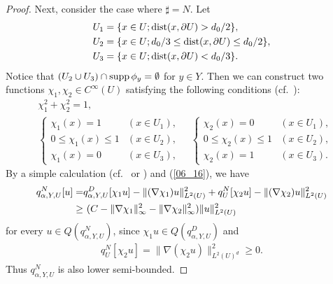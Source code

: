 \documentclass[12pt,a4paper]{article}
\def\supp{\mathop{\rm supp}\nolimits}
\def\dist{\mathop{\rm dist}\nolimits}
\begin{document}
\begin{proof}
Next, consider the case where $\sharp=N$.
Let
\begin{align*}
& U_1=\{x\in U;\dist(x,\partial U)>d_0/2\},\\
& U_2=\{x\in U;d_0/3\leq \dist(x,\partial U)\leq d_0/2\},\\
& U_3=\{x\in U;\dist(x,\partial U)<d_0/3\}.
\end{align*}
Notice that $(U_2\cup U_3)\cap \supp \phi_y=\emptyset$ for $y\in Y$.
Then we can construct two functions $\chi_1,\chi_2\in C^\infty(U)$
satisfying the following conditions
(cf.\ \cite[Proposition 8.1]{Do-Iw-Mi}):
\begin{align*}
& \chi_1^2+\chi_2^2=1,\\
&
\begin{cases}
\chi_1(x) =1 & (x\in U_1),\\
0\leq \chi_1(x) \leq 1 & (x\in U_2),\\
\chi_1(x) =0 & (x\in U_3),
\end{cases}
\quad 
\begin{cases}
\chi_2(x) =0 & (x\in U_1),\\
0\leq \chi_2(x) \leq 1 & (x\in U_2),\\
\chi_2(x) =1 & (x\in U_3).
\end{cases}
\end{align*}
By a simple calculation (cf.\ \cite[Theorem 3.2]{Cy-Fr-Ki-Si} or 
\cite[(6.14)]{Do-Iw-Mi})
and (\ref{06_16}), 
we have
\begin{align}
 q^N_{\alpha,Y,U}[u]
=&
 q^D_{\alpha,Y,U}[\chi_1 u]
-
\|(\nabla\chi_1)u\|_{L^2(U)}^2
+
 q^N_{U}[\chi_2 u]
-
\|(\nabla\chi_2)u\|_{L^2(U)}^2\notag\\
\geq&\ 
(C
-\|\nabla\chi_1\|_\infty^2
-\|\nabla\chi_2\|_\infty^2
)\|u\|_{L^2(U)}^2
\label{06_17}
\end{align}
for every $u\in Q(q^N_{\alpha,Y,U})$,
since $\chi_1 u\in Q(q^D_{\alpha,Y,U})$ and
\begin{align*}
 q^N_{U}[\chi_2u]=\|\nabla(\chi_2 u)\|_{L^2(U)^d}^2 \geq 0.
\end{align*}
Thus $q^N_{\alpha,Y,U}$ is also lower semi-bounded.


\end{proof}
\end{document}
